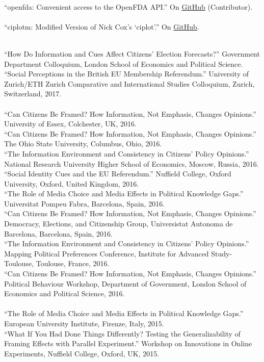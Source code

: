 \documentclass[12pt]{article}
\renewcommand{\section}[1]{\pagebreak[3]%
    \llap{\scshape\smash{\parbox[t]{\marginparwidth}{\raggedright {\color{lg}#1}}}}%
    \vspace{-\baselineskip}\par}
\newcommand{\topic}[1]{\pagebreak[3]\indent {\color{lg}{\footnotesize #1 }}\\}
\newcommand{\entry}[1]{\indent {\color{lg}\guillemotright}\hspace{2pt}#1\vspace{.25em}\\}
\begin{document}
    \topic{R packages contributed to the rOpenHealth project}
	\entry{``openfda: Convenient access to the OpenFDA API.'' On \href{https://github.com/ropenhealth/openfda}{GitHub} (Contributor).}

	\topic{Stata Packages}
	\entry{``ciplotm: Modified Version of Nick Cox's `ciplot'.'' On \href{https://github.com/leeper/ciplotm}{GitHub}.}

\section{Invited\\Presentations\\\& Conference\\Papers}
	\topic{Invited Presentations (2017)}
	\entry{``How Do Information and Cues Affect Citizens' Election Forecasts?'' Government Department Colloquium, London School of Economics and Political Science.}
    \entry{``Social Perceptions in the British EU Membership Referendum.'' University of Zurich/ETH Zurich Comparative and International Studies Colloquium, Zurich, Switzerland, 2017.}
	
	\topic{Invited Presentations (2016)}
	\entry{``Can Citizens Be Framed? How Information, Not Emphasis, Changes Opinions.'' University of Essex, Colchester, UK, 2016.}
	\entry{``Can Citizens Be Framed? How Information, Not Emphasis, Changes Opinions.'' The Ohio State University, Columbus, Ohio, 2016.}
	\entry{``The Information Environment and Consistency in Citizens' Policy Opinions.'' National Research University Higher School of Economics, Moscow, Russia, 2016.}
	\entry{``Social Identity Cues and the EU Referendum.'' Nuffield College, Oxford University, Oxford, United Kingdom, 2016.}
	\entry{``The Role of Media Choice and Media Effects in Political Knowledge Gaps.'' Universitat Pompeu Fabra, Barcelona, Spain, 2016.}
	\entry{``Can Citizens Be Framed? How Information, Not Emphasis, Changes Opinions.'' Democracy, Elections, and Citizenship Group, Universistat Autonoma de Barcelona, Barcelona, Spain, 2016.}
	\entry{``The Information Environment and Consistency in Citizens' Policy Opinions.'' Mapping Political Preferences Conference, Institute for Advanced Study-Toulouse, Toulouse, France, 2016.}
	\entry{``Can Citizens Be Framed? How Information, Not Emphasis, Changes Opinions.'' Political Behaviour Workshop, Department of Government, London School of Economics and Political Science, 2016.}

	\topic{Invited Presentations (2015)}
	\entry{``The Role of Media Choice and Media Effects in Political Knowledge Gaps.'' European University Institute, Firenze, Italy, 2015.}
	\entry{``What If You Had Done Things Differently? Testing the Generalizability of Framing Effects with Parallel Experiment.'' Workshop on Innovations in Online Experiments, Nuffield College, Oxford, UK, 2015.}
	
\end{document}
